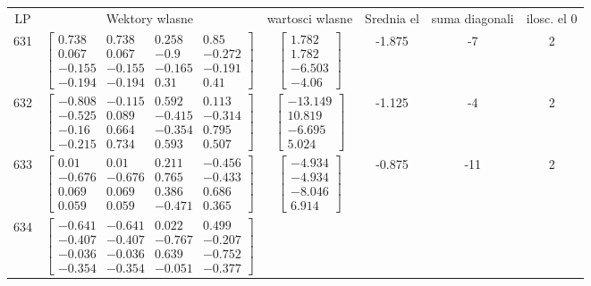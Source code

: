 \documentclass[a4paper,12pt]{article}
\begin{document}
\bgroup {} \vspace{0.2in} \begin{tabular}{c c c c c c}
LP &Wektory wlasne & wartosci wlasne & Srednia el & suma diagonali & ilosc. el 0\\
631
&
$\begin{bmatrix} 0.738 & 0.738 & 0.258 & 0.85 \\ 0.067 & 0.067 & -0.9 & -0.272 \\ -0.155 & -0.155 & -0.165 & -0.191 \\ -0.194 & -0.194 & 0.31 & 0.41 \end{bmatrix}$
&
$\begin{bmatrix} 1.782 \\ 1.782 \\ -6.503 \\ -4.06 \end{bmatrix}$
&
-1.875
&
-7
&
2
\\
632
&
$\begin{bmatrix} -0.808 & -0.115 & 0.592 & 0.113 \\ -0.525 & 0.089 & -0.415 & -0.314 \\ -0.16 & 0.664 & -0.354 & 0.795 \\ -0.215 & 0.734 & 0.593 & 0.507 \end{bmatrix}$
&
$\begin{bmatrix} -13.149 \\ 10.819 \\ -6.695 \\ 5.024 \end{bmatrix}$
&
-1.125
&
-4
&
2
\\
633
&
$\begin{bmatrix} 0.01 & 0.01 & 0.211 & -0.456 \\ -0.676 & -0.676 & 0.765 & -0.433 \\ 0.069 & 0.069 & 0.386 & 0.686 \\ 0.059 & 0.059 & -0.471 & 0.365 \end{bmatrix}$
&
$\begin{bmatrix} -4.934 \\ -4.934 \\ -8.046 \\ 6.914 \end{bmatrix}$
&
-0.875
&
-11
&
2
\\
634
&
$\begin{bmatrix} -0.641 & -0.641 & 0.022 & 0.499 \\ -0.407 & -0.407 & -0.767 & -0.207 \\ -0.036 & -0.036 & 0.639 & -0.752 \\ -0.354 & -0.354 & -0.051 & -0.377 \end{bmatrix}$

\end{tabular}
\end{document}
